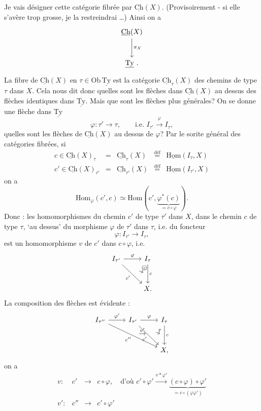 \documentclass[11pt]{article}
\newcommand{\printedpage}[1]{\if\relax\detokenize{#1}\relax\else\marginpar{\raggedright\footnotesize p.~#1}\fi}
\newcommand{\msp}[1]{\marginpar{\raggedright\footnotesize [#1]}}
\newcommand{\uHom}{\underline{\mathrm{Hom}}}
\newcommand{\Hom}{\mathrm{Hom}}
\newcommand{\uCh}{\underline{\mathrm{Ch}}}
\newcommand{\uTy}{\underline{\mathrm{Ty}}}
\newcommand{\circled}[1]{\text{\textcircled{$\scriptstyle #1$}}}
\begin{document}
\msp{page 27}
Je vais désigner cette catégorie fibrée par $\uCh(X)$. (Provisoirement - si elle s'avère trop grosse, je la restreindrai \dots) Ainsi on a
\[
\begin{tikzcd}[row sep=large]
\uCh(X) \arrow[d, "\pi_X"] \\
\uTy\ .
\end{tikzcd}
\]
La fibre de $\uCh(X)$ en $\tau\in\mathrm{Ob}\,\uTy$ est la catégorie $\uCh_\tau(X)$ des chemins de type $\tau$ dans $X$. Cela nous dit donc quelles sont les flèches dans $\uCh(X)$ au dessus des flèches identiques dans $\uTy$. Mais que sont les flèches plus générales? On se donne une flèche dans $\uTy$
\[
\varphi : \tau' \longrightarrow \tau, \qquad \text{i.e. } I_{\tau'} \xrightarrow{\varphi} I_\tau,
\]
quelles sont les flèches de $\uCh(X)$ au dessus de $\varphi$? Par le sorite général des catégories fibrées, si
\[
\begin{array}{lclcl}
c\in\uCh(X)_\tau & = & \uCh_\tau(X) & \overset{\text{déf}}{=} & \uHom(I_\tau,X)\\[1ex]
c'\in\uCh(X)_{\tau'} & = & \uCh_{\tau'}(X) & \overset{\text{déf}}{=} & \uHom(I_{\tau'},X)
\end{array}
\]
on a
\[
\boxed{\Hom_\varphi(c',c)\simeq\Hom(c',\underbrace{\varphi^*(c)}_{=c\circ\varphi}).}
\]
Donc : les homomorphismes du
\printedpage{18}
\msp{page 28}
chemin $c'$ de type $\tau'$ dans $X$, dans le chemin $c$ de type $\tau$, ‘au dessus’ du morphisme $\varphi$ de $\tau'$ dans $\tau$, i.e. du foncteur
\[
\varphi : I_{\tau'} \longrightarrow I_\tau,
\]
est un homomorphisme $v$ de $c'$ dans $c\circ\varphi$, i.e.
\[
\begin{tikzcd}[row sep=large]
I_{\tau'} \arrow[r, "\varphi"] \arrow[dr, "c'"', ""{name=A}] & I_\tau \arrow[d, "c", ""'{name=B}] \\
& X.
\arrow[from=A, to=B, bend left=20, shorten <=6pt, shorten >=2pt, "\circled{v}"]
\end{tikzcd}
\]
La composition des flèches est évidente :
\[
\begin{tikzcd}[row sep=large]
I_{\tau''} \arrow[r, "\varphi'"] \arrow[drr, "c''"', ""{name=C}] & I_{\tau'} \arrow[r, "\varphi"] \arrow[dr, "c'"', ""{name=A}] & I_\tau \arrow[d, "c", ""'{name=B}] \\
& & X,
\arrow[from=A, to=B, bend left=20, shorten <=6pt, shorten >=2pt, "v"]
\arrow[from=C, to=A, shorten <=4pt, shorten >=4pt, "v'"]
\end{tikzcd}
\]
on a
\[
\begin{array}{rccl}
v : & c' & \longrightarrow & c\circ\varphi, \quad \text{d'où } c'\circ\varphi' \xrightarrow{v*\varphi'} \underbrace{(c\circ\varphi)\circ\varphi'}_{=c\circ(\varphi\varphi')}\\[3ex]
v' : & c'' & \longrightarrow & c'\circ\varphi'
\end{array}
\]
\end{document}
